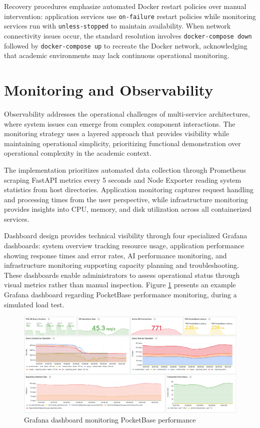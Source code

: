 Recovery procedures emphasize automated Docker restart policies over manual intervention: application services use \texttt{on-failure} restart policies while monitoring services run with \texttt{unless-stopped} to maintain availability. When network connectivity issues occur, the standard resolution involves \texttt{docker-compose down} followed by \texttt{docker-compose up} to recreate the Docker network, acknowledging that academic environments may lack continuous operational monitoring.

\section{Monitoring and Observability} \label{section:monitoring_observability}

Observability addresses the operational challenges of multi-service architectures, where system issues can emerge from complex component interactions. The monitoring strategy uses a layered approach that provides visibility while maintaining operational simplicity, prioritizing functional demonstration over operational complexity in the academic context.

The implementation prioritizes automated data collection through Prometheus scraping FastAPI metrics every 5 seconds and Node Exporter reading system statistics from host directories. Application monitoring captures request handling and processing times from the user perspective, while infrastructure monitoring provides insights into CPU, memory, and disk utilization across all containerized services.

Dashboard design provides technical visibility through four specialized Grafana dashboards: system overview tracking resource usage, application performance showing response times and error rates, AI performance monitoring, and infrastructure monitoring supporting capacity planning and troubleshooting. These dashboards enable administrators to assess operational status through visual metrics rather than manual inspection. Figure \ref{fig:docker_architecture} presents an example Grafana dashboard regarding PocketBase performance monitoring, during a simulated load test.

\begin{figure}[htbp]
    \centering
    \includegraphics[width=\textwidth]{figs/chapter4/grafana_dashboard.png}
    \caption[Grafana Dashboard Monitoring]{Grafana dashboard monitoring PocketBase performance}
    \label{fig:docker_architecture}
\end{figure}

